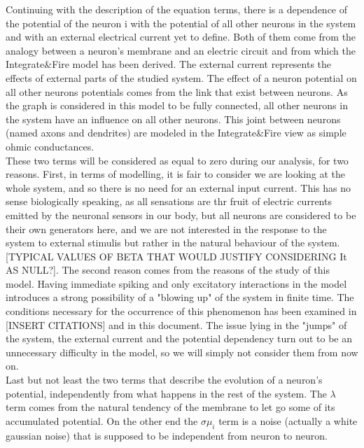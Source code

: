 \documentclass{report}
\begin{document}
	Continuing with the description of the equation terms, there is a dependence of the potential of the neuron i with the potential of all other neurons in the system and with an external electrical current yet to define. Both of them come from the analogy between a neuron's membrane and an electric circuit and from which the Integrate\&Fire model has been derived. The external current represents the effects of external parts of the studied system. The effect of a neuron potential on all other neurons potentials comes from the link that exist between neurons. As the graph is considered in this model to be fully connected, all other neurons in the system have an influence on all other neurons. This joint between neurons (named axons and dendrites) are modeled in the Integrate\&Fire view as simple ohmic conductances.\\
	These two terms will be considered as equal to zero during our analysis, for two reasons. First, in terms of modelling, it is fair to consider we are looking at the whole system, and so there is no need for an external input current. This has no sense biologically speaking, as all sensations are thr fruit of electric currents emitted by the neuronal sensors in our body, but all neurons are considered to be their own generators here, and we are not interested in the response to the system to external stimulis but rather in the natural behaviour of the system. [TYPICAL VALUES OF BETA THAT WOULD JUSTIFY CONSIDERING It AS NULL?]. The second reason comes from the reasons of the study of this model. Having immediate spiking and only excitatory interactions in the model introduces a strong possibility of a "blowing up" of the system in finite time. The conditions necessary for the occurrence of this phenomenon has been examined in [INSERT CITATIONS] and in this document. The issue lying in the "jumps" of the system, the external current and the potential dependency turn out to be an unnecessary difficulty in the model, so we will simply not consider them from now on.\\

	Last but not least the two terms that describe the evolution of a neuron's potential, independently from what happens in the rest of the system. The $\lambda$ term comes from the natural tendency of the membrane to let go some of its accumulated potential. On the other end the $\sigma\mu_i$ term is a noise (actually a white gaussian noise) that is supposed to be independent from neuron to neuron.\\
\end{document}
